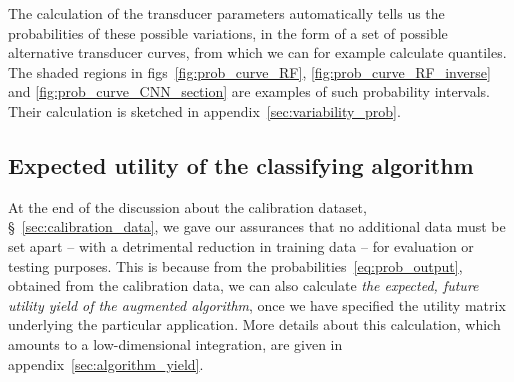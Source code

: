 \documentclass[\ifafour a4paper,12pt,\else a5paper,10pt,\fi%
onecolumn,oneside,article,%
british%
]{memoir}
\theoremstyle{remark}
\theoremstyle{innote}
\renewcommand*{\|}[1][]{\nonscript\:#1\vert\nonscript\:\mathopen{}}
\newcommand*{\sect}{\S}%
\newcommand*{\figs}{figs}%
\begin{document}
The calculation of the transducer parameters automatically tells us the probabilities of these possible variations, in the form of  a set of possible alternative transducer curves, from which we can for example calculate quantiles. The shaded regions in \figs~\ref{fig:prob_curve_RF}, \ref{fig:prob_curve_RF_inverse} and \ref{fig:prob_curve_CNN_section} are examples of such probability intervals. Their calculation is sketched in appendix~\ref{sec:variability_prob}.

\subsection{Expected utility of the classifying algorithm}
\label{sec:yield_of_classifier}

At the end of the discussion about the calibration dataset, \sect~\ref{sec:calibration_data}, we gave our assurances that no additional data must be set apart -- with a detrimental reduction in training data -- for evaluation or testing purposes. This is because from the probabilities~\eqref{eq:prob_output}, obtained from the calibration data, we can also calculate \emph{the expected, future utility yield of the augmented algorithm}, once we have specified the utility matrix underlying the particular application. More details about this calculation, which amounts to a low-dimensional integration, are given in appendix~\ref{sec:algorithm_yield}.
\end{document}
